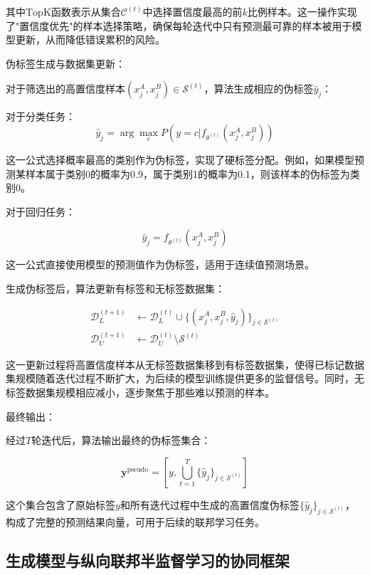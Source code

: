 其中$\text{TopK}$函数表示从集合$\mathcal{C}^{(t)}$中选择置信度最高的前$k$比例样本。这一操作实现了"置信度优先"的样本选择策略，确保每轮迭代中只有预测最可靠的样本被用于模型更新，从而降低错误累积的风险。

伪标签生成与数据集更新：

对于筛选出的高置信度样本$(x^A_j,x^B_j) \in \mathcal{S}^{(t)}$，算法生成相应的伪标签$\hat{y}_j$：

对于分类任务：
\begin{equation}
	\hat{y}_j = \arg\max_c P(y=c|f_{\theta^{(t)}}(x^A_j,x^B_j))
\end{equation}

这一公式选择概率最高的类别作为伪标签，实现了硬标签分配。例如，如果模型预测某样本属于类别0的概率为0.9，属于类别1的概率为0.1，则该样本的伪标签为类别0。

对于回归任务：

\begin{equation}
	\hat{y}_j = f_{\theta^{(t)}}(x^A_j,x^B_j)
\end{equation}

这一公式直接使用模型的预测值作为伪标签，适用于连续值预测场景。

生成伪标签后，算法更新有标签和无标签数据集：

\begin{align}
	\mathcal{D}_L^{(t+1)} &\leftarrow \mathcal{D}_L^{(t)} \cup \{(x^A_j,x^B_j,\hat{y}_j)\}_{j\in\mathcal{S}^{(t)}} \\
	\mathcal{D}_U^{(t+1)} &\leftarrow \mathcal{D}_U^{(t)} \setminus \mathcal{S}^{(t)}
\end{align}


这一更新过程将高置信度样本从无标签数据集移到有标签数据集，使得已标记数据集规模随着迭代过程不断扩大，为后续的模型训练提供更多的监督信号。同时，无标签数据集规模相应减小，逐步聚焦于那些难以预测的样本。

最终输出：

经过$T$轮迭代后，算法输出最终的伪标签集合：

\begin{equation}
	\mathbf{y}^{\text{pseudo}} = \left[ y, \bigcup_{t=1}^{T} \{\hat{y}_j\}_{j \in \mathcal{S}^{(t)}} \right]
\end{equation}


这个集合包含了原始标签$y$和所有迭代过程中生成的高置信度伪标签$\{\hat{y}_j\}_{j \in \mathcal{S}^{(t)}}$，构成了完整的预测结果向量，可用于后续的联邦学习任务。


\subsection{生成模型与纵向联邦半监督学习的协同框架}

